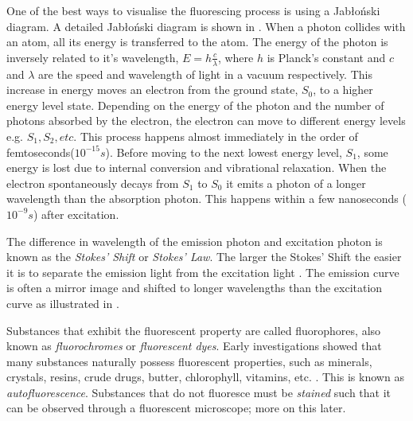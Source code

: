 \begin{definition}
	One of the best ways to visualise the fluorescing process is using a Jab{\l}o{\'n}ski diagram.
	A detailed Jab{\l}o{\'n}ski diagram is shown in . 
	When a photon collides with an atom, all its energy is transferred to the atom. The energy of the photon is inversely related to it's wavelength, $E = h \frac{c}{\lambda}$, where $h$ is Planck's constant and $c$ and $\lambda$ are the speed and wavelength of light in a vacuum respectively.
	This increase in energy moves an electron from the ground state, $S_0$, to a higher energy level state.
	Depending on the energy of the photon and the number of photons absorbed by the electron, the electron can move to different energy levels e.g. $S_1, S_2, etc$.
	This process happens almost immediately in the order of femtoseconds($10^{-15}s$).
	Before moving to the next lowest energy level, $S_1$, some energy is lost due to internal conversion and vibrational relaxation.
	When the electron spontaneously decays from $S_1$ to $S_0$ it emits a photon of a longer wavelength than the absorption photon.
	This happens within a few nanoseconds ($10^{-9}s$) after excitation.
	
	The difference in wavelength of the emission photon and excitation photon is known as the \textit{Stokes' Shift} or \textit{Stokes' Law}.
	The larger the Stokes' Shift the easier it is to separate the emission light from the excitation light \citep{Spring2003}.
	The emission curve is often a mirror image and shifted to longer wavelengths than the excitation curve as illustrated in .
\end{definition}

\begin{definition}[Fluorophores]
	Substances that exhibit the fluorescent property are called fluorophores, also known as \textit{fluorochromes} or \textit{fluorescent dyes}.
	Early investigations showed that many substances naturally possess fluorescent properties, such as minerals, crystals, resins, crude drugs, butter, chlorophyll, vitamins, etc. \citep{Spring2003}.
	This is known as \textit{autofluorescence}.
	Substances that do not fluoresce must be \textit{stained} such that it can be observed through a fluorescent microscope; more on this later.
\end{definition}


